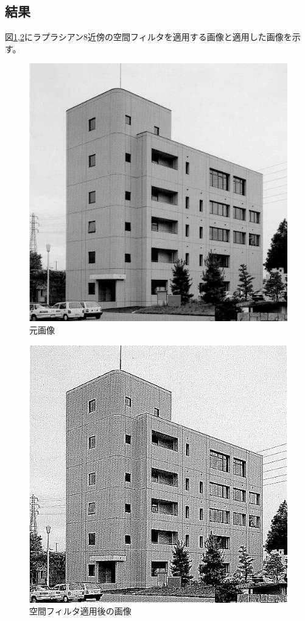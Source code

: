 \documentclass[11pt,a4paper,titlepage,dvipdfmx]{jarticle}
\begin{document}
  \subsection{結果}
    図\ref{fig:building-sharp},\ref{fig:after-building-sharp}にラプラシアン8近傍の空間フィルタを適用する画像と適用した画像を示す。
    \begin{figure}[H]
      \centering
      \includegraphics[scale=.8]{./building.bmp}
      \caption{元画像}
      \label{fig:building-sharp}
    \end{figure} 
    \begin{figure}[H]
      \centering
      \includegraphics[scale=.8]{./sharp-building.bmp}
      \caption{空間フィルタ適用後の画像}
      \label{fig:after-building-sharp}
    \end{figure}  
  
\end{document}
